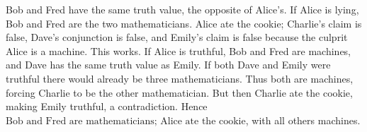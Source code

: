 Bob and Fred have the same truth value, the opposite of Alice's. If Alice is lying, Bob and Fred are the two mathematicians. Alice ate the cookie; Charlie's claim is false, Dave's conjunction is false, and Emily's claim is false because the culprit Alice is a machine. This works. If Alice is truthful, Bob and Fred are machines, and Dave has the same truth value as Emily. If both Dave and Emily were truthful there would already be three mathematicians. Thus both are machines, forcing Charlie to be the other mathematician. But then Charlie ate the cookie, making Emily truthful, a contradiction. Hence $\boxed{\text{Bob and Fred are mathematicians; Alice ate the cookie}}$, with all others machines.
